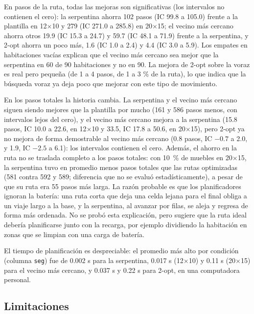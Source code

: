 \documentclass[11pt,letterpaper]{article}
\begin{document}
En pasos de la ruta, todas las mejoras son significativas (los intervalos no contienen el cero): la serpentina ahorra 102 pasos (IC 99.8 a 105.0) frente a la plantilla en 12$\times$10 y 279 (IC 271.0 a 285.8) en 20$\times$15; el vecino más cercano ahorra otros 19.9 (IC 15.3 a 24.7) y 59.7 (IC 48.1 a 71.9) frente a la serpentina, y 2-opt ahorra un poco más, 1.6 (IC 1.0 a 2.4) y 4.4 (IC 3.0 a 5.9). Los empates en habitaciones vacías explican que el vecino más cercano sea mejor que la serpentina en 60 de 90 habitaciones y no en 90. La mejora de 2-opt sobre la voraz es real pero pequeña (de 1 a 4 pasos, de 1 a 3 \% de la ruta), lo que indica que la búsqueda voraz ya deja poco que mejorar con este tipo de movimiento.

En los pasos totales la historia cambia. La serpentina y el vecino más cercano siguen siendo mejores que la plantilla por mucho (161 y 586 pasos menos, con intervalos lejos del cero), y el vecino más cercano mejora a la serpentina (15.8 pasos, IC 10.0 a 22.6, en 12$\times$10 y 33.5, IC 17.8 a 50.6, en 20$\times$15), pero 2-opt ya no mejora de forma demostrable al vecino más cercano (0.8 pasos, IC $-0.7$ a 2.0, y 1.9, IC $-2.5$ a 6.1): los intervalos contienen el cero. Además, el ahorro en la ruta no se traslada completo a los pasos totales: con 10~\% de muebles en 20$\times$15, la serpentina tuvo en promedio menos pasos totales que las rutas optimizadas (581 contra 592 y 589; diferencia que no se evaluó estadísticamente), a pesar de que su ruta era 55 pasos más larga. La razón probable es que los planificadores ignoran la batería: una ruta corta que deja una celda lejana para el final obliga a un viaje largo a la base, y la serpentina, al avanzar por filas, se aleja y regresa de forma más ordenada. No se probó esta explicación, pero sugiere que la ruta ideal debería planificarse junto con la recarga, por ejemplo dividiendo la habitación en zonas que se limpian con una carga de batería.

El tiempo de planificación es despreciable: el promedio más alto por condición (columna \texttt{seg}) fue de 0.002 s para la serpentina, 0.017 s (12$\times$10) y 0.11 s (20$\times$15) para el vecino más cercano, y 0.037 s y 0.22 s para 2-opt, en una computadora personal.

\subsection{Limitaciones}
\end{document}
